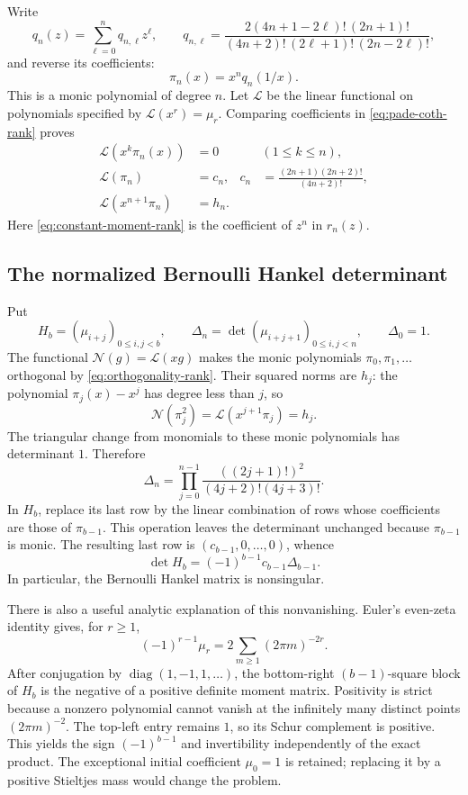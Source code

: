 Write
\begin{equation}\label{eq:q-explicit-rank}
 q_n(z)=\sum_{\ell=0}^nq_{n,\ell}z^\ell,
 \qquad
 q_{n,\ell}=
 \frac{2(4n+1-2\ell)!\,(2n+1)!}
 {(4n+2)!\,(2\ell+1)!\,(2n-2\ell)!},
\end{equation}
and reverse its coefficients:
\[
 \pi_n(x)=x^nq_n(1/x).
\]
This is a monic polynomial of degree $n$.
Let $\mathcal L$ be the linear functional on polynomials specified by
$\mathcal L(x^r)=\mu_r$.  Comparing coefficients in
\eqref{eq:pade-coth-rank} proves
\begin{align}
 \mathcal L(x^k\pi_n(x))&=0 &&(1\leq k\leq n),
       \label{eq:orthogonality-rank}\\
 \mathcal L(\pi_n)&=c_n,
 &c_n&=\frac{(2n+1)(2n+2)!}{(4n+2)!},
       \label{eq:constant-moment-rank}\\
 \mathcal L(x^{n+1}\pi_n)&=h_n.
       \label{eq:shifted-norm-rank}
\end{align}
Here \eqref{eq:constant-moment-rank} is the coefficient of $z^n$
in $r_n(z)$.

\subsection{The normalized Bernoulli Hankel determinant}

Put
\[
 H_b=(\mu_{i+j})_{0\leq i,j<b},\qquad
 \Delta_n=\det(\mu_{i+j+1})_{0\leq i,j<n},\qquad\Delta_0=1.
\]
The functional $\mathcal N(g)=\mathcal L(xg)$ makes the monic
polynomials $\pi_0,\pi_1,\ldots$ orthogonal by
\eqref{eq:orthogonality-rank}.  Their squared norms are $h_j$:
the polynomial $\pi_j(x)-x^j$ has degree less than $j$, so
\[
 \mathcal N(\pi_j^2)=\mathcal L(x^{j+1}\pi_j)=h_j.
\]
The triangular change from monomials to these monic polynomials has
determinant $1$.  Therefore
\begin{equation}\label{eq:delta-product-rank}
 \Delta_n=\prod_{j=0}^{n-1}
       \frac{((2j+1)!)^2}{(4j+2)!(4j+3)!}.
\end{equation}
In $H_b$, replace its last row by the linear combination of rows
whose coefficients are those of $\pi_{b-1}$.  This operation leaves
the determinant unchanged because $\pi_{b-1}$ is monic.
The resulting last row is $(c_{b-1},0,\ldots,0)$, whence
\begin{equation}\label{eq:H-product-rank}
 \det H_b=(-1)^{b-1}c_{b-1}\Delta_{b-1}.
\end{equation}
In particular, the Bernoulli Hankel matrix is nonsingular.

There is also a useful analytic explanation of this nonvanishing.
Euler's even-zeta identity gives, for $r\geq1$,
\[
 (-1)^{r-1}\mu_r
 =2\sum_{m\geq1}(2\pi m)^{-2r}.
\]
After conjugation by $\operatorname{diag}(1,-1,1,\ldots)$, the
bottom-right $(b-1)$-square block of $H_b$ is the negative of a
positive definite moment matrix.  Positivity is strict because a
nonzero polynomial cannot vanish at the infinitely many distinct
points $(2\pi m)^{-2}$.  The top-left entry remains $1$, so its
Schur complement is positive.  This yields the sign
$(-1)^{b-1}$ and invertibility independently of the exact product.
The exceptional initial coefficient $\mu_0=1$ is retained; replacing
it by a positive Stieltjes mass would change the problem.

